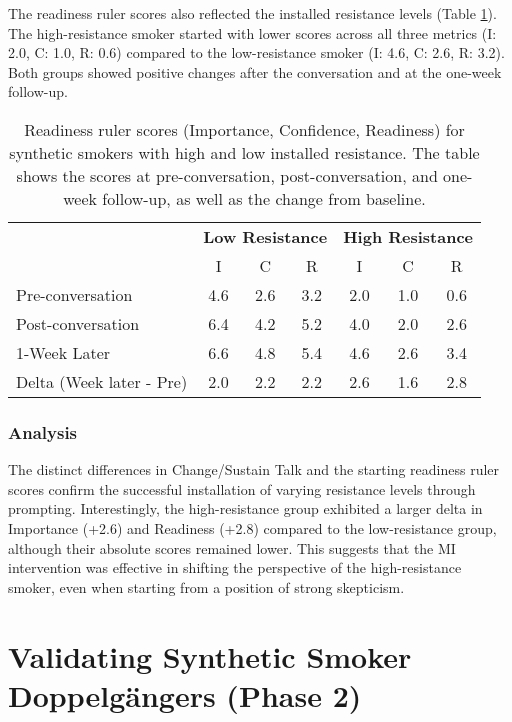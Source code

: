 The readiness ruler scores also reflected the installed resistance levels (Table \ref{tab:resistance_readiness_rulers}). The high-resistance smoker started with lower scores across all three metrics (I: 2.0, C: 1.0, R: 0.6) compared to the low-resistance smoker (I: 4.6, C: 2.6, R: 3.2). Both groups showed positive changes after the conversation and at the one-week follow-up.

\begin{table}[h]
\centering
\caption[Readiness Rulers for High/Low Resistance Smokers]{Readiness ruler scores (Importance, Confidence, Readiness) for synthetic smokers with high and low installed resistance. The table shows the scores at pre-conversation, post-conversation, and one-week follow-up, as well as the change from baseline.}
\label{tab:resistance_readiness_rulers}
\begin{tabular}{|l|ccc|ccc|}
\hline
 & \multicolumn{3}{c|}{\textbf{Low Resistance}} & \multicolumn{3}{c|}{\textbf{High Resistance}} \\
 & I & C & R & I & C & R \\ \hline
Pre-conversation & 4.6 & 2.6 & 3.2 & 2.0 & 1.0 & 0.6 \\
Post-conversation & 6.4 & 4.2 & 5.2 & 4.0 & 2.0 & 2.6 \\
1-Week Later & 6.6 & 4.8 & 5.4 & 4.6 & 2.6 & 3.4 \\ \hline
Delta (Week later - Pre) & 2.0 & 2.2 & 2.2 & 2.6 & 1.6 & 2.8 \\ \hline
\end{tabular}
\end{table}

\subsubsection{Analysis}

The distinct differences in Change/Sustain Talk and the starting readiness ruler scores confirm the successful installation of varying resistance levels through prompting. Interestingly, the high-resistance group exhibited a larger delta in Importance (+2.6) and Readiness (+2.8) compared to the low-resistance group, although their absolute scores remained lower. This suggests that the MI intervention was effective in shifting the perspective of the high-resistance smoker, even when starting from a position of strong skepticism.

\section{Validating Synthetic Smoker Doppelgängers (Phase 2)}

